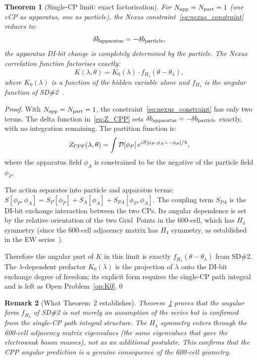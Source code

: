 \documentclass[11pt,a4paper]{article}
\newtheorem{theorem}{Theorem}[section]
\newtheorem{remark}[theorem]{Remark}
\newcommand{\Napp}{N_{\rm app}}
\newcommand{\Npart}{N_{\rm part}}
\begin{document}
\begin{theorem}[Single-CP limit: exact factorisation]
\label{thm:single}
For $\Napp = \Npart = 1$ (one eCP as apparatus, one as particle),
the Nexus constraint~\eqref{eq:nexus_constraint} reduces to:
\begin{equation}
\delta b_{\rm apparatus} = -\delta b_{\rm particle},
\label{eq:exact_nexus}
\end{equation}
the apparatus DI-bit change is completely determined by the
particle.  The Nexus correlation function factorises exactly:
\begin{equation}
K(\lambda,\theta) = K_0(\lambda) \cdot f_{H_4}(\theta - \theta_\lambda),
\label{eq:K_single}
\end{equation}
where $K_0(\lambda)$ is a function of the hidden variable alone
and $f_{H_4}$ is the angular function of SD\#2~\citep{cpp_sd2}.
\end{theorem}

\begin{proof}
With $\Napp = \Npart = 1$, the constraint~\eqref{eq:nexus_constraint}
has only two terms.  The delta function in~\eqref{eq:Z_CPP} sets
$\delta b_{\rm apparatus} = -\delta b_{\rm particle}$ exactly,
with no integration remaining.  The partition function is:
\begin{equation}
Z_{\rm CPP}(\lambda,\theta)
= \int \mathcal{D}[\phi_P]\,e^{iS[\phi_P,\phi_A=-\phi_P]/\hbar},
\label{eq:Z_single}
\end{equation}
where the apparatus field $\phi_A$ is constrained to be the
negative of the particle field $\phi_P$.

The action separates into particle and apparatus terms:
$S[\phi_P, \phi_A] = S_P[\phi_P] + S_A[\phi_A] + S_{PA}[\phi_P,\phi_A]$.
The coupling term $S_{PA}$ is the DI-bit exchange interaction between
the two CPs.  Its angular dependence is set by the relative
orientation of the two Grid~Points in the 600-cell, which has $H_4$
symmetry (since the 600-cell adjacency matrix has $H_4$ symmetry,
as established in the EW series~\citep{cpp_ew_unified}).

Therefore the angular part of $K$ in this limit is exactly
$f_{H_4}(\theta - \theta_\lambda)$ from SD\#2.  The
$\lambda$-dependent prefactor $K_0(\lambda)$ is the projection of
$\lambda$ onto the DI-bit exchange degree of freedom; its explicit
form requires the single-CP path integral and is left as Open
Problem~\ref{op:K0}.\qed
\end{proof}

\begin{remark}[What Theorem~2 establishes]
Theorem~\ref{thm:single} proves that the angular form $f_{H_4}$
of SD\#2 is not merely an assumption of the series but is
confirmed from the single-CP path integral structure.  The $H_4$
symmetry enters through the 600-cell adjacency matrix eigenvalues
(the same eigenvalues that gave the electroweak boson masses), not
as an additional postulate.  This confirms that the CPP angular
prediction is a genuine consequence of the 600-cell geometry.
\end{remark}
\end{document}
